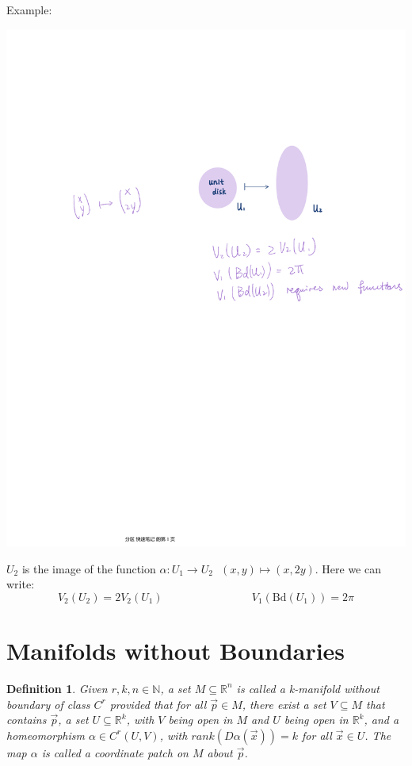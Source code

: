 \documentclass[11pt,oneside]{book}
\theoremstyle{break}
\theoremstyle{break}
\newtheorem{defn}{Definition}[corL]
\newcommand{\R}{\mathbb{R}}
\newcommand{\N}{\mathbb{N}}
\newcommand{\Bd}{\text{Bd}}
\newcommand{\example}{\color{green}Example: \color{black}}
\begin{document}
\example 
\begin{center}
\includegraphics[scale=0.8]{manifold-disk.pdf}
\end{center}
$U_2$ is the image of the function $\alpha:U_1 \to U_2 \ \ \ (x,y) \mapsto (x,2y)$. Here we can write:
$$V_2(U_2)= 2V_2(U_1) \qquad \qquad \qquad \qquad V_1(\Bd(U_1)) = 2\pi$$
\hfill\break



\newpage
\section[Manifolds without Boundaries]{\color{red}Manifolds without Boundaries\color{black}}
\begin{defn}
Given $r,k,n \in \N$, a set $M \subseteq \R^n$ is called a k-manifold without boundary of class $C^r$ provided that for all $\vec{p} \in M$, there exist a set $V \subseteq M$ that contains $\vec{p}$, a set $U\subseteq \R^k$, with $V$ being open in $M$ and $U$ being open in $\R^k$, and a homeomorphism $\alpha \in C^r(U,V)$, with $rank(D\alpha(\vec{x})) = k$ for all $\vec{x}\in U$. The map $\alpha$ is called a coordinate patch on $M$ about $\vec{p}$.
\end{defn}
\end{document}
